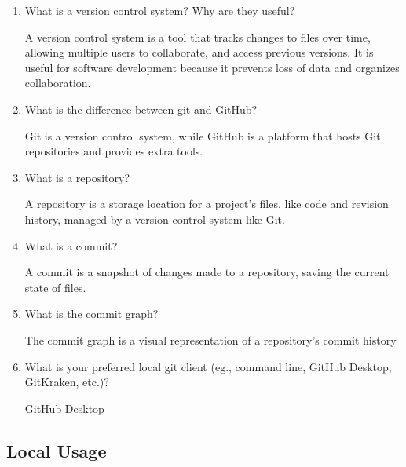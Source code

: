 \documentclass[10pt,twocolumn]{article}
\begin{document}
\begin{enumerate}
    \item What is a version control system? Why are they useful?

    A version control system is a tool that tracks changes to files over time, allowing multiple users to collaborate, and access previous versions. It is useful for software development because it prevents loss of data and organizes collaboration.
    
    \item What is the difference between git and GitHub?

    Git is a version control system, while GitHub is a platform that hosts Git repositories and provides extra tools.
    
    \item What is a repository?

    A repository is a storage location for a project's files, like code and revision history, managed by a version control system like Git.
    
    \item What is a commit?

    A commit is a snapshot of changes made to a repository, saving the current state of files.
    
    \item What is the commit graph?

    The commit graph is a visual representation of a repository's commit history
    
    \item What is your preferred local git client (eg., command line, GitHub Desktop, GitKraken, etc.)?

    GitHub Desktop
    
\end{enumerate}

\subsection{Local Usage}
\end{document}
